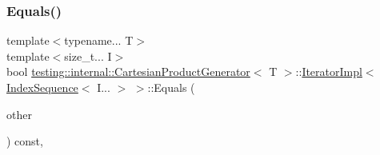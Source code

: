 \subsubsection{\texorpdfstring{Equals()}{Equals()}\hspace{0.1cm}{\footnotesize\ttfamily [1/2]}}
{\footnotesize\ttfamily template$<$typename... T$>$ \\
template$<$size\+\_\+t... I$>$ \\
bool \mbox{\hyperlink{classtesting_1_1internal_1_1_cartesian_product_generator}{testing\+::internal\+::\+Cartesian\+Product\+Generator}}$<$ T $>$\+::\mbox{\hyperlink{classtesting_1_1internal_1_1_cartesian_product_generator_1_1_iterator_impl}{Iterator\+Impl}}$<$ \mbox{\hyperlink{structtesting_1_1internal_1_1_index_sequence}{Index\+Sequence}}$<$ I... $>$ $>$\+::Equals (\begin{DoxyParamCaption}\item[{const \mbox{\hyperlink{classtesting_1_1internal_1_1_param_iterator_interface}{Param\+Iterator\+Interface}}$<$ \mbox{\hyperlink{classtesting_1_1internal_1_1_cartesian_product_generator_af27131157a9347f0c82420ca081ee7dd}{Param\+Type}} $>$ \&}]{other }\end{DoxyParamCaption}) const\hspace{0.3cm}{\ttfamily [inline]}, {\ttfamily [override]}}

\mbox{\label{classtesting_1_1internal_1_1_cartesian_product_generator_1_1_iterator_impl_3_01_index_sequence_3_01_i_8_8_8_01_4_01_4_a7ba6129ccd025c1cb0e00fe71b8c8489}} 
